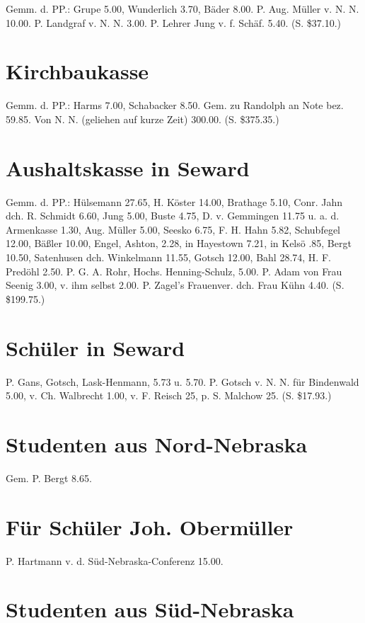 Gemm. d. PP.: Grupe 5.00, Wunderlich 3.70, Bäder 8.00. P. Aug. Müller v. N. N. 10.00. P. Landgraf v. N. N. 3.00. P. Lehrer Jung v. f. Schäf. 5.40. (S. \$37.10.)

\section{Kirchbaukasse}

Gemm. d. PP.: Harms 7.00, Schabacker 8.50. Gem. zu Randolph an Note bez. 59.85. Von N. N. (geliehen auf kurze Zeit) 300.00. (S. \$375.35.)

\section{Aushaltskasse in Seward}

Gemm. d. PP.: Hülsemann 27.65, H. Köster 14.00, Brathage 5.10, Conr. Jahn dch. R. Schmidt 6.60, Jung 5.00, Buste 4.75, D. v. Gemmingen 11.75 u. a. d. Armenkasse 1.30, Aug. Müller 5.00, Seesko 6.75, F. H. Hahn 5.82, Schubfegel 12.00, Bäßler 10.00, Engel, Ashton, 2.28, in Hayestown 7.21, in Kelsö .85, Bergt 10.50, Satenhusen dch. Winkelmann 11.55, Gotsch 12.00, Bahl 28.74, H. F. Predöhl 2.50. P. G. A. Rohr, Hochs. Henning-Schulz, 5.00. P. Adam von Frau Seenig 3.00, v. ihm selbst 2.00. P. Zagel's Frauenver. dch. Frau Kühn 4.40. (S. \$199.75.)

\section{Schüler in Seward}

P. Gans, Gotsch, Lask-Henmann, 5.73 u. 5.70. P. Gotsch v. N. N. für Bindenwald 5.00, v. Ch. Walbrecht 1.00, v. F. Reisch 25, p. S. Malchow 25. (S. \$17.93.)

\section{Studenten aus Nord-Nebraska}

Gem. P. Bergt 8.65.

\section{Für Schüler Joh. Obermüller}

P. Hartmann v. d. Süd-Nebraska-Conferenz 15.00.

\section{Studenten aus Süd-Nebraska}

